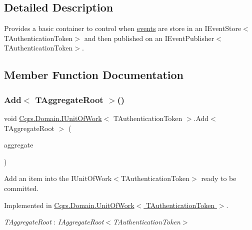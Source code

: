 \subsection{Detailed Description}
Provides a basic container to control when \hyperlink{}{events} are store in an I\+Event\+Store$<$\+T\+Authentication\+Token$>$ and then published on an I\+Event\+Publisher$<$\+T\+Authentication\+Token$>$. 



\subsection{Member Function Documentation}
\mbox{\label{interfaceCqrs_1_1Domain_1_1IUnitOfWork_a786ebca85b4ef7294b98280230ef1397_a786ebca85b4ef7294b98280230ef1397}} 
\subsubsection{\texorpdfstring{Add$<$ T\+Aggregate\+Root $>$()}{Add< TAggregateRoot >()}}
{\footnotesize\ttfamily void \hyperlink{interfaceCqrs_1_1Domain_1_1IUnitOfWork}{Cqrs.\+Domain.\+I\+Unit\+Of\+Work}$<$ T\+Authentication\+Token $>$.Add$<$ T\+Aggregate\+Root $>$ (\begin{DoxyParamCaption}\item[{T\+Aggregate\+Root}]{aggregate }\end{DoxyParamCaption})}



Add an item into the I\+Unit\+Of\+Work$<$\+T\+Authentication\+Token$>$ ready to be committed. 



Implemented in \hyperlink{classCqrs_1_1Domain_1_1UnitOfWork_a840214f97d3661c7b5a739df65fadc9f_a840214f97d3661c7b5a739df65fadc9f}{Cqrs.\+Domain.\+Unit\+Of\+Work$<$ T\+Authentication\+Token $>$}.

\begin{Desc}
\item[Type Constraints]\begin{description}
\item[{\em T\+Aggregate\+Root} : {\em I\+Aggregate\+Root$<$T\+Authentication\+Token$>$}]\end{description}
\end{Desc}
\mbox{\label{interfaceCqrs_1_1Domain_1_1IUnitOfWork_ade600c9bf9e8380c24eaf1e7e0df6e01_ade600c9bf9e8380c24eaf1e7e0df6e01}} 
